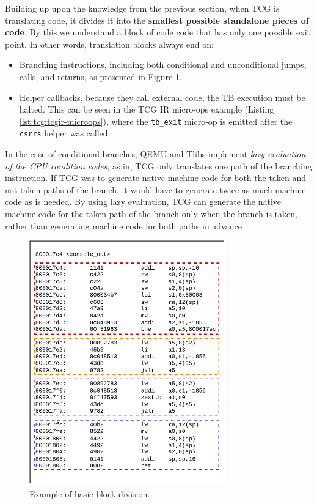 Building up upon the knowledge from the previous section, when TCG is translating code, it divides it into the \textbf{smallest possible standalone pieces of code}. By this we understand a block of code code that has only one
possible exit point. In other words, translation blocks always end on:
\begin{itemize}
    \item{Branching instructions, including both conditional and unconditional jumps, calls, and returns, as presented in Figure \ref{fig:block-division}.}
    \item{Helper callbacks, because they call external code, the TB execution must be halted. This can be seen
    in the TCG IR micro-ops example (Listing \ref{lst:tcg:tcgir-microops}), where the \texttt{tb\_exit} micro-op is emitted
    after the \texttt{csrrs} helper was called.}
\end{itemize}

In the case of conditional branches, QEMU and Tlibs implement \textit{lazy evaluation of the CPU condition codes},
as in, TCG only translates one path of the branching instruction. If TCG was to generate native machine code
for both the taken and not-taken paths of the branch, it would have to generate twice as much machine code as is needed.
By using lazy evaluation, TCG can generate the native machine code for the taken path of the branch only when the
branch is taken, rather than generating machine code for both paths in advance \cite{QemuInternalsTech}.

\pagebreak
\begin{figure}[h]
	\centering
	\includegraphics[height=400px]{figures/TranslactionBlocks.pdf}
	\caption{Example of basic block division.}
    \label{fig:block-division}
\end{figure}

